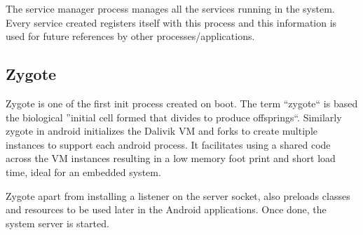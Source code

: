 The service manager process manages all the services running in the system.
Every service created registers itself with this process and this information
is used for future references by other processes/applications.

\subsection{Zygote}

Zygote is one of the first init process created on boot. The term ``zygote`` is based the biological ''initial cell formed
that divides to produce offsprings``. Similarly zygote in android initializes the Dalivik VM and
forks to create multiple instances to support each android process. It facilitates using a shared code
across the VM instances resulting in a low memory foot print and short load time, ideal for an embedded system.

Zygote apart from installing a listener on the server socket, also preloads classes and
resources to be used later in the Android applications. Once done, the system server is started.
